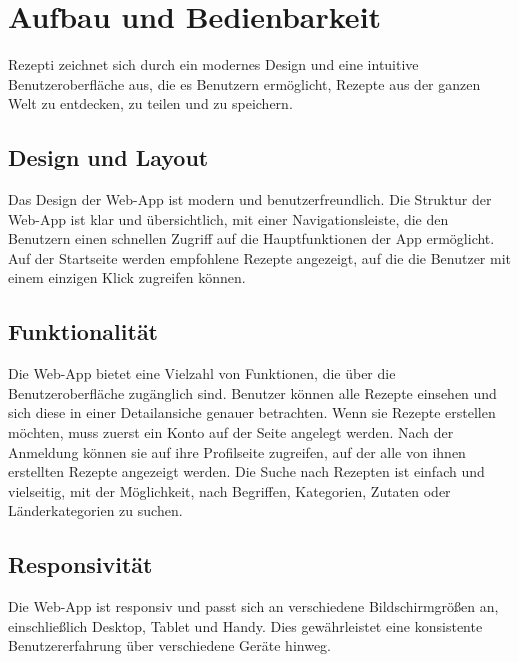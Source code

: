 \documentclass{article}
\begin{document}
\pagebreak

\section{Aufbau und Bedienbarkeit}
Rezepti zeichnet sich durch ein modernes Design und eine intuitive Benutzeroberfläche aus, die es Benutzern ermöglicht, Rezepte aus der ganzen Welt zu entdecken, zu teilen und zu speichern.

\subsection{Design und Layout}
Das Design der Web-App ist modern und benutzerfreundlich. Die Struktur der Web-App ist klar und übersichtlich, mit einer Navigationsleiste, die den Benutzern einen schnellen Zugriff auf die Hauptfunktionen der App ermöglicht. Auf der Startseite werden empfohlene Rezepte angezeigt, auf die die Benutzer mit einem einzigen Klick zugreifen können.

\subsection{Funktionalität}
Die Web-App bietet eine Vielzahl von Funktionen, die über die Benutzeroberfläche zugänglich sind. Benutzer können alle Rezepte einsehen und sich diese in einer Detailansiche genauer betrachten. Wenn sie Rezepte erstellen möchten, muss zuerst ein Konto auf der Seite angelegt werden. Nach der Anmeldung können sie auf ihre Profilseite zugreifen, auf der alle von ihnen  erstellten Rezepte angezeigt werden.  Die Suche nach Rezepten ist einfach und vielseitig, mit der Möglichkeit, nach Begriffen, Kategorien, Zutaten oder Länderkategorien zu suchen.

\subsection{Responsivität}
Die Web-App ist responsiv und passt sich an verschiedene Bildschirmgrößen an, einschließlich Desktop, Tablet und Handy. Dies gewährleistet eine konsistente Benutzererfahrung über verschiedene Geräte hinweg.
\end{document}
